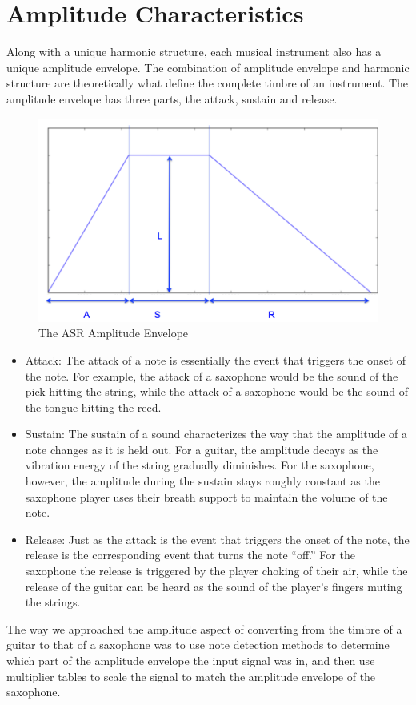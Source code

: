 \documentclass[12pt]{article}
\begin{document}
\color{black}
\section{Amplitude Characteristics}
Along with a unique harmonic structure, each musical instrument also has a unique amplitude envelope. The combination of amplitude envelope and harmonic structure are theoretically what define the complete timbre of an instrument.  The amplitude envelope has three parts, the attack, sustain and release. 

\begin{figure}[H]
\includegraphics[scale=0.5]{Pictures/ASR.png}
\centering
\caption{The ASR Amplitude Envelope}
\centering
\end{figure}

\begin{itemize}
\item Attack: The attack of a note is essentially the event that triggers the onset of the note. For example, the attack of a saxophone would be the sound of the pick hitting the string, while the attack of a saxophone would be the sound of the tongue hitting the reed.
\item Sustain: The sustain of a sound characterizes the way that the amplitude of a note changes as it is held out. For a guitar, the amplitude decays as the vibration energy of the string gradually diminishes. For the saxophone, however, the amplitude during the sustain stays roughly constant as the saxophone player uses their breath support to maintain the volume of the note.
\item Release: Just as the attack is the event that triggers the onset of the note, the release is the corresponding event that turns the note ``off.'' For the saxophone the release is triggered by the player choking of their air, while the release of the guitar can be heard as the sound of the player's fingers muting the strings.
\end{itemize}
\noindent
The way we approached the amplitude aspect of converting from the timbre of a guitar to that of a saxophone was to use note detection methods to determine which part of the amplitude envelope the input signal was in, and then use multiplier tables to scale the signal to match the amplitude envelope of the saxophone.
\end{document}
